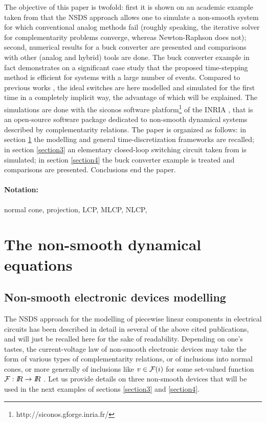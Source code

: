 \documentclass{article}
\begin{document}
The objective of this paper is twofold: first it is shown on an academic example taken from \cite{maffezzoni2006} that the NSDS approach allows one to simulate a non-smooth system for which conventional analog methods fail (roughly speaking, the iterative solver for complementarity problems converge, whereas Newton-Raphson does not); second, numerical results for a buck converter are presented and comparisons with other (analog and hybrid) tools are done. The buck converter example in fact demonstrates on a significant case study that the proposed time-stepping method is efficient for systems with a large number of events. Compared to previous works \cite{glocker2005,vasca2009}, the ideal switches are here modelled and simulated for the first time in a completely implicit way, the advantage of which will be explained.  The simulations are done with the {\sc siconos} software platform\footnote{http://siconos.gforge.inria.fr/} of the INRIA \cite{acary-brogliato2008,Acary-Perignon2007,mathmod}, that is an open-source software package dedicated to non-smooth dynamical systems described by complementarity relations. The paper is organized as follows: in section \ref{section2} the modelling and general time-discretization frameworks are recalled; in section \ref{section3} an elementary closed-loop switching circuit taken from \cite{maffezzoni2006} is simulated; in section \ref{section4} the buck converter example is treated and comparisons are presented. Conclusions end the paper. 



\paragraph{Notation:} normal cone, projection, LCP, MLCP, NLCP,




\section{The non-smooth dynamical equations}
\label{section2}

\subsection{Non-smooth electronic devices modelling}
\label{section21}

The NSDS approach for the  modelling of piecewise linear components in electrical circuits has been described in detail  in several of the above cited publications, and will just be recalled here for the sake of readability. Depending on one's tastes, the current-voltage law of non-smooth electronic devices may take the form of various types of complementarity relations, or of inclusions into normal cones, or more generally of inclusions like $v \in {\cal F}(i)$ for some set-valued function ${\cal F}: \mbox{\rm $I\!\!R$} \rightarrow \mbox{\rm $I\!\!R$}$ \cite{adly2007,glocker2005}. Let us provide details on three non-smooth devices that will be used in the next examples of sections \ref{section3} and \ref{section4}. 
\end{document}

